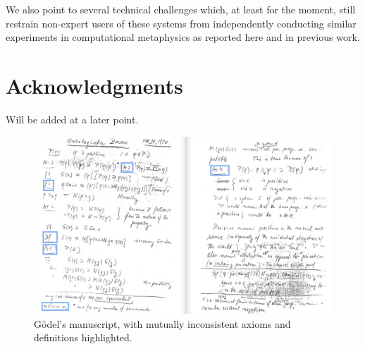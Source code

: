 \documentclass{article}
\begin{document}
We also point to several technical challenges which, at least for the
moment, still restrain non-expert users of these systems from
independently conducting similar experiments in computational
metaphysics as reported here and in previous work.



\section*{Acknowledgments}

Will be added at a later point.



\begin{figure}
\centerline{\includegraphics[width=\textwidth]{./Images/Manuscript2.png}}
\caption{G\"{o}del's manuscript, with mutually inconsistent axioms and definitions highlighted.} \label{GoedelScript}
\end{figure}


\appendix




\end{document}
